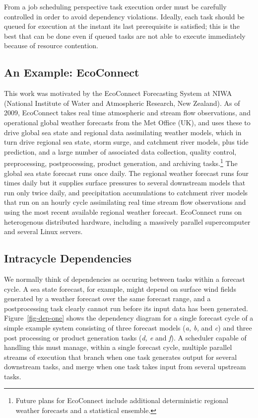 \documentclass[11pt,a4paper]{article}
\begin{document}
From a job scheduling perspective task execution order must be carefully
controlled in order to avoid dependency violations. Ideally, each task
should be queued for execution at the instant its last prerequisite is
satisfied; this is the best that can be done even if queued tasks are
not able to execute immediately because of resource contention.


\subsection{An Example: EcoConnect}

This work was motivated by the EcoConnect Forecasting System at NIWA
(National Institute of Water and Atmospheric Research, New Zealand). As
of 2009, EcoConnect takes real time atmospheric and stream flow
observations, and operational global weather forecasts from the Met
Office (UK), and uses these to drive global sea state and regional data
assimilating weather models, which in turn drive regional sea state,
storm surge, and catchment river models, plus tide prediction, and a
large number of associated data collection, quality control,
preprocessing, postprocessing, product generation, and archiving
tasks.\footnote{Future plans for EcoConnect include additional
deterministic regional weather forecasts and a statistical ensemble.}
The global sea state forecast runs once daily.  The regional weather
forecast runs four times daily but it supplies surface pressures to
several downstream models that run only twice daily, and precipitation
accumulations to catchment river models that run on an hourly cycle
assimilating real time stream flow observations and using the most
recent available regional weather forecast.  EcoConnect runs on
heterogenous distributed hardware, including a massively parallel
supercomputer and several Linux servers. 

\subsection{Intracycle Dependencies}

We normally think of dependencies as occuring between tasks within a
forecast cycle. A sea state forecast, for example, might depend on
surface wind fields generated by a weather forecast over the same
forecast range, and a postprocessing task clearly cannot run before its
input data has been generated. Figure~\ref{fig-dep-one} shows the
dependency diagram for a single forecast cycle of a simple example
system consisting of three forecast models ({\em a, b,} and {\em c}) and
three post processing or product generation tasks ({\em d, e} and {\em
f}).  A scheduler capable of handling this must manage, within a single
forecast cycle, multiple parallel streams of execution that branch when
one task generates output for several downstream tasks, and merge when
one task takes input from several upstream tasks. 
\end{document}
